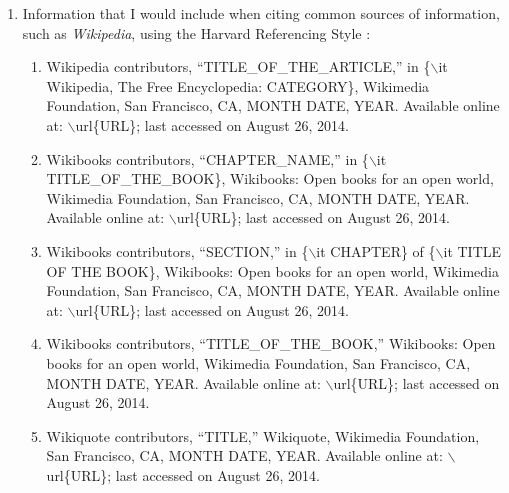 \documentclass[letter,12pt]{article}
\begin{document}
\begin{enumerate}
\begin{enumerate}
	\item Typeset the \LaTeX\ document: \vspace{-0.2cm}
		\begin{enumerate} \itemsep -2pt
		\item Typesetting the \LaTeX\ document using the \LaTeX\ {\tt $\backslash$nocite\{$\ast$\}} command should run faster than using a \LaTeX\ {\tt $\backslash$cite} command or multiple \LaTeX\ {\tt $\backslash$cite} commands.
		\end{enumerate}
	\item Check that the font and style of the reference list is correct.
	\item If there are errors, correct the errors as appropriate.
	\item Finally, the {\sc Bib}\TeX\ database should be correct.
	\end{enumerate}
\item Information that I would include when citing common sources of information, such as {\it Wikipedia}, using the Harvard Referencing Style \cite{MendeleyLimitedStaff2022b,MendeleyLimitedStaff2022a,Turabian2018,Turabian2007,WikipediaContributors2023e,WikipediaContributors2023d}: \vspace{-0.3cm}
	\begin{enumerate} \itemsep -2pt
	\item Wikipedia contributors, ``TITLE\_OF\_THE\_ARTICLE,'' in \{$\backslash$it Wikipedia, The Free Encyclopedia: CATEGORY\}, Wikimedia Foundation, San Francisco, CA, MONTH DATE, YEAR. Available online at: $\backslash$url\{URL\}; last accessed on August 26, 2014.
	\item Wikibooks contributors, ``CHAPTER\_NAME,'' in \{$\backslash$it TITLE\_OF\_THE\_BOOK\}, Wikibooks: Open books for an open world, Wikimedia Foundation, San Francisco, CA, MONTH DATE, YEAR. Available online at: $\backslash$url\{URL\}; last accessed on August 26, 2014.
	\item Wikibooks contributors, ``SECTION,'' in \{$\backslash$it CHAPTER\} of \{$\backslash$it TITLE OF THE BOOK\}, Wikibooks: Open books for an open world, Wikimedia Foundation, San Francisco, CA, MONTH DATE, YEAR. Available online at: $\backslash$url\{URL\}; last accessed on August 26, 2014.
	\item Wikibooks contributors, ``TITLE\_OF\_THE\_BOOK,'' Wikibooks: Open books for an open world, Wikimedia Foundation, San Francisco, CA, MONTH DATE, YEAR. Available online at: $\backslash$url\{URL\}; last accessed on August 26, 2014.
	\item Wikiquote contributors, ``TITLE,'' Wikiquote, Wikimedia Foundation, San Francisco, CA, MONTH DATE, YEAR. Available online at: $\backslash$url\{URL\}; last accessed on August 26, 2014.

\end{enumerate}
\end{enumerate}
\end{document}
